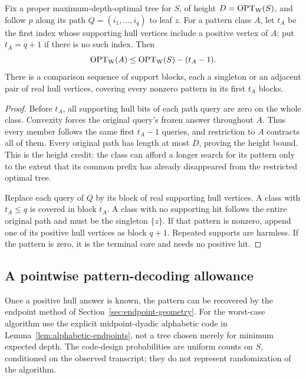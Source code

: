 \begin{lemma}\label{lem:height-prefix}
Fix a proper maximum-depth-optimal tree for $S$, of height
$D=\operatorname{OPT}_{\mathrm W}(S)$, and follow $p$ along its path
$Q=(i_1,\ldots,i_q)$ to leaf $z$.
For a pattern class $A$, let $t_A$ be the first index whose
supporting hull vertices include a positive vertex of $A$;
put $t_A=q+1$ if there is no such index. Then
\[
 \operatorname{OPT}_{\mathrm W}(A)\le \operatorname{OPT}_{\mathrm W}(S)-(t_A-1).
\]
There is a comparison sequence of support blocks, each a singleton
or an adjacent pair of real hull vertices, covering every nonzero
pattern in its first $t_A$ blocks.
\end{lemma}
\begin{proof}
Before $t_A$, all supporting hull bits of each path query are zero
on the whole class. Convexity forces the original query's frozen
answer throughout $A$. Thus every member follows the same first
$t_A-1$ queries, and restriction to $A$ contracts all of them.
Every original path has length at most $D$, proving the height bound.
This is the height credit: the class can afford a longer search for
its pattern only to the extent that its common prefix has already
disappeared from the restricted optimal tree.

Replace each query of $Q$ by its block of real supporting
hull vertices. A class with $t_A\le q$ is covered in block $t_A$.
A class with no supporting hit follows the entire original path
and must be the singleton $\{z\}$. If that pattern is nonzero,
append one of its positive hull vertices as block $q+1$.
Repeated supports are harmless. If the pattern is zero, it is the
terminal core and needs no positive hit.
\end{proof}

\subsection{A pointwise pattern-decoding allowance}

Once a positive hull answer is known, the pattern can be recovered
by the endpoint method of Section~\ref{sec:endpoint-geometry}.
For the worst-case algorithm use the explicit midpoint-dyadic
alphabetic code in Lemma~\ref{lem:alphabetic-endpoints}, not a tree
chosen merely for minimum expected depth.
The code-design probabilities are uniform counts on $S$, conditioned
on the observed transcript; they do not represent randomization of
the algorithm.

